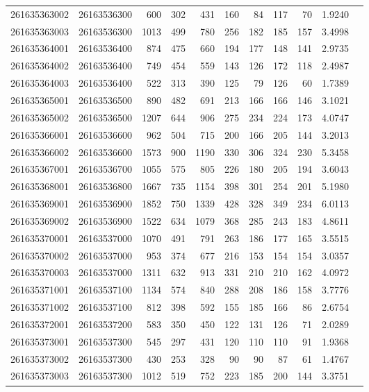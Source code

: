 \documentclass[11pt,landscape]{article}
\begin{document}
{\begin{longtable}[]{@{}lrrrrrrrrrr@{}}
261635363002 & 26163536300 & 600 & 302 & 431 & 160 & 84 & 117 & 70 & 1.9240 \\
261635363003 & 26163536300 & 1013 & 499 & 780 & 256 & 182 & 185 & 157 & 3.4998 \\
261635364001 & 26163536400 & 874 & 475 & 660 & 194 & 177 & 148 & 141 & 2.9735 \\
261635364002 & 26163536400 & 749 & 454 & 559 & 143 & 126 & 172 & 118 & 2.4987 \\
261635364003 & 26163536400 & 522 & 313 & 390 & 125 & 79 & 126 & 60 & 1.7389 \\
261635365001 & 26163536500 & 890 & 482 & 691 & 213 & 166 & 166 & 146 & 3.1021 \\
261635365002 & 26163536500 & 1207 & 644 & 906 & 275 & 234 & 224 & 173 & 4.0747 \\
261635366001 & 26163536600 & 962 & 504 & 715 & 200 & 166 & 205 & 144 & 3.2013 \\
261635366002 & 26163536600 & 1573 & 900 & 1190 & 330 & 306 & 324 & 230 & 5.3458 \\
261635367001 & 26163536700 & 1055 & 575 & 805 & 226 & 180 & 205 & 194 & 3.6043 \\
261635368001 & 26163536800 & 1667 & 735 & 1154 & 398 & 301 & 254 & 201 & 5.1980 \\
261635369001 & 26163536900 & 1852 & 750 & 1339 & 428 & 328 & 349 & 234 & 6.0113 \\
261635369002 & 26163536900 & 1522 & 634 & 1079 & 368 & 285 & 243 & 183 & 4.8611 \\
261635370001 & 26163537000 & 1070 & 491 & 791 & 263 & 186 & 177 & 165 & 3.5515 \\
261635370002 & 26163537000 & 953 & 374 & 677 & 216 & 153 & 154 & 154 & 3.0357 \\
261635370003 & 26163537000 & 1311 & 632 & 913 & 331 & 210 & 210 & 162 & 4.0972 \\
261635371001 & 26163537100 & 1134 & 574 & 840 & 288 & 208 & 186 & 158 & 3.7776 \\
261635371002 & 26163537100 & 812 & 398 & 592 & 155 & 185 & 166 & 86 & 2.6754 \\
261635372001 & 26163537200 & 583 & 350 & 450 & 122 & 131 & 126 & 71 & 2.0289 \\
261635373001 & 26163537300 & 545 & 297 & 431 & 120 & 110 & 110 & 91 & 1.9368 \\
261635373002 & 26163537300 & 430 & 253 & 328 & 90 & 90 & 87 & 61 & 1.4767 \\
261635373003 & 26163537300 & 1012 & 519 & 752 & 223 & 185 & 200 & 144 & 3.3751 \\

\end{longtable}}
\end{document}
